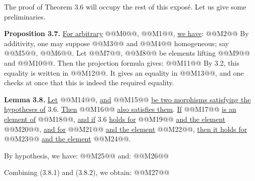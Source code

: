The proof of
Theorem 3.6 will occupy the rest of this exposé. Let us give some preliminaries.

\textbf{Proposition 3.7.} \uline{For arbitrary} @@M0@@, @@M1@@, \uline{we have}:
@@M2@@
By additivity, one may suppose @@M3@@ and @@M4@@ homogeneous; say @@M5@@, @@M6@@.
Let @@M7@@, @@M8@@ be elements lifting @@M9@@ and @@M10@@. Then the projection formula gives:
@@M11@@
By 3.2, this equality is written in
@@M12@@. It gives an equality in
@@M13@@, and one checks at once that this is indeed the required equality.

\textbf{Lemma 3.8.} \uline{Let} @@M14@@, \uline{and} @@M15@@ \uline{be two morphisms satisfying the hypotheses of} 3.6. \uline{Then} @@M16@@ \uline{also satisfies them}. \uline{If} @@M17@@ \uline{is an element of} @@M18@@, \uline{and if} 3.6 \uline{holds for} @@M19@@ \uline{and the element} @@M20@@, \uline{and for} @@M21@@ \uline{and the element} @@M22@@, \uline{then it holds for} @@M23@@ \uline{and the element} @@M24@@.

By hypothesis, we have:
@@M25@@
and:
@@M26@@

Combining (3.8.1) and (3.8.2), we obtain:
@@M27@@
